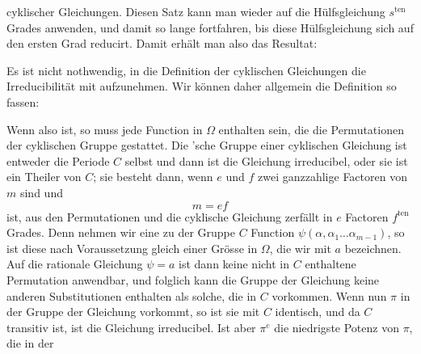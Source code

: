 cyklischer Gleichungen. Diesen Satz kann man wieder auf die
Hülfsgleichung $s^{\mathrm{ten}}$ Grades anwenden, und damit so lange fortfahren, bis diese Hülfsgleichung sich auf den ersten Grad reducirt. Damit erhält man also das Resultat:


Es ist nicht nothwendig, in die Definition der cyklischen Gleichungen die Irreducibilität mit aufzunehmen. Wir können daher allgemein die Definition so fassen:


Wenn also
ist, so muss jede Function in $\Omega$ enthalten sein, die die Permutationen der cyklischen Gruppe
gestattet. Die 'sche Gruppe einer cyklischen Gleichung ist entweder die Periode $C$ selbst und dann ist die Gleichung irreducibel, oder sie ist ein Theiler von $C$; sie besteht dann, wenn $e$ und $f$ zwei ganzzahlige Factoren von $m$ sind und
\[
m = ef
\]
ist, aus den Permutationen
und die cyklische Gleichung zerfällt in $e$ Factoren $f^{\mathrm{ten}}$ Grades. Denn nehmen wir eine zu der Gruppe $C$  Function $\psi(\alpha, \alpha_1 \ldots \alpha_{m-1})$, so ist diese nach Voraussetzung gleich einer Grösse in $\Omega$, die wir mit $a$ bezeichnen. Auf die rationale Gleichung $\psi = a$ ist dann keine nicht in $C$ enthaltene Permutation anwendbar, und folglich kann die Gruppe der Gleichung keine anderen Substitutionen enthalten als solche, die in $C$ vorkommen. Wenn nun $\pi$ in der Gruppe der Gleichung vorkommt, so ist sie mit $C$ identisch, und da $C$ transitiv ist, ist die Gleichung irreducibel. Ist aber $\pi^e$ die niedrigste Potenz von $\pi$, die in der
